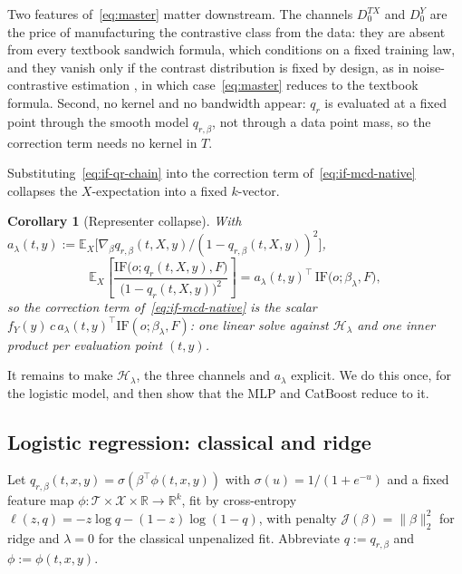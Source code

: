 \documentclass[11pt]{article}
\newtheorem{corollary}{Corollary}
\newcommand{\Eb}{\mathbb{E}}
\newcommand{\Tset}{\mathcal{T}}
\newcommand{\Xset}{\mathcal{X}}
\newcommand{\IF}{\mathrm{IF}}
\newcommand{\Hb}{\mathcal{H}}
\begin{document}
Two features of~\eqref{eq:master} matter downstream. The channels $D_0^{TX}$ and
$D_0^{Y}$ are the price of manufacturing the contrastive class from the data: they
are absent from every textbook sandwich formula, which conditions on a fixed training
law, and they vanish only if the contrast distribution is fixed by design, as in
noise-contrastive estimation \citep{gutmann2010nce}, in which case~\eqref{eq:master}
reduces to the textbook formula. Second, no kernel and no bandwidth appear: $q_r$ is
evaluated at a fixed point through the smooth model $q_{r,\beta}$, not through a data
point mass, so the correction term needs no kernel in $T$.

Substituting~\eqref{eq:if-qr-chain} into the correction term
of~\eqref{eq:if-mcd-native} collapses the $X$-expectation into a fixed $k$-vector.

\begin{corollary}[Representer collapse]
\label{cor:collapse}
With
$a_\lambda(t,y):=\Eb_X\!\big[\nabla_\beta q_{r,\beta}(t,X,y)/(1-q_{r,\beta}(t,X,y))^2\big]$,
\begin{equation}
\Eb_X\!\left[\frac{\IF\big(o;q_r(t,X,y),F\big)}{\big(1-q_r(t,X,y)\big)^2}\right]
= a_\lambda(t,y)^\top\,\IF\big(o;\beta_\lambda,F\big),
\label{eq:collapse}
\end{equation}
so the correction term of~\eqref{eq:if-mcd-native} is the scalar
$f_Y(y)\,c\,a_\lambda(t,y)^\top\IF(o;\beta_\lambda,F)$: one linear solve against
$\Hb_\lambda$ and one inner product per evaluation point $(t,y)$.
\end{corollary}

It remains to make $\Hb_\lambda$, the three channels and $a_\lambda$ explicit. We do
this once, for the logistic model, and then show that the MLP and CatBoost reduce to
it.

\subsection{Logistic regression: classical and ridge}
\label{sec:if-qr-logistic}

Let $q_{r,\beta}(t,x,y)=\sigma(\beta^\top\phi(t,x,y))$ with $\sigma(u)=1/(1+e^{-u})$
and a fixed feature map $\phi:\Tset\times\Xset\times\mathbb{R}\to\mathbb{R}^k$, fit by
cross-entropy $\ell(z,q)=-z\log q-(1-z)\log(1-q)$, with penalty
$\mathcal{J}(\beta)=\|\beta\|_2^2$ for ridge and $\lambda=0$ for the classical
unpenalized fit. Abbreviate $q:=q_{r,\beta}$ and $\phi:=\phi(t,x,y)$.
\end{document}
